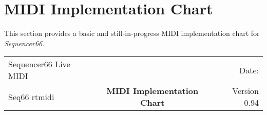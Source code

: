 %
%
%

\section{MIDI Implementation Chart}
\label{sec:midi_impl_chart}

   This section provides a basic and still-in-progress MIDI implementation
   chart for \textsl{Sequencer66}.

   \begin{table}[htb]
      \label{table:midi_impl_chart_top}
      \begin{tabular}{l c r}
         Sequencer66 Live MIDI &   & Date: \date{\today} \\
         Seq66 rtmidi & \textbf{MIDI Implementation Chart} & Version 0.94 \\
      \end{tabular}
   \end{table}

